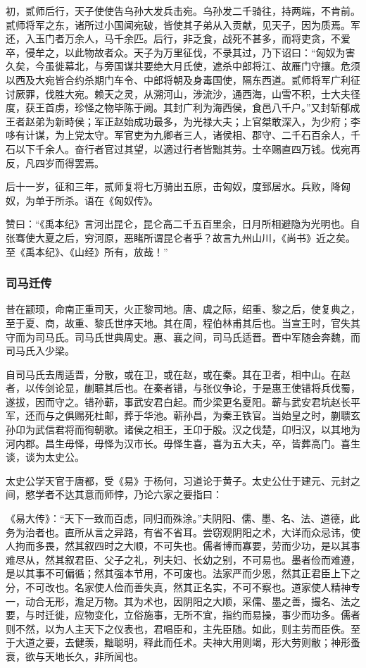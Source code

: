 \documentclass[]{article}
\begin{document}
初，贰师后行，天子使使告乌孙大发兵击宛。乌孙发二千骑往，持两端，不肯前。贰师将军之东，诸所过小国闻宛破，皆使其子弟从入贡献，见天子，因为质焉。军还，入玉门者万余人，马千余匹。后行，非乏食，战死不甚多，而将吏贪，不爱卒，侵牟之，以此物故者众。天子为万里征伐，不录其过，乃下诏曰：``匈奴为害久矣，今虽徙幕北，与旁国谋共要绝大月氏使，遮杀中郎将江、故雁门守攘。危须以西及大宛皆合约杀期门车令、中郎将朝及身毒国使，隔东西道。贰师将军广利征讨厥罪，伐胜大宛。赖天之灵，从溯河山，涉流沙，通西海，山雪不积，士大夫径度，获王首虏，珍怪之物毕陈于阙。其封广利为海西侯，食邑八千户。''又封斩郁成王者赵弟为新畤侯；军正赵始成功最多，为光禄大夫；上官桀敢深入，为少府；李哆有计谋，为上党太守。军官吏为九卿者三人，诸侯相、郡守、二千石百余人，千石以下千余人。奋行者官过其望，以適过行者皆黜其劳。士卒赐直四万钱。伐宛再反，凡四岁而得罢焉。

后十一岁，征和三年，贰师复将七万骑出五原，击匈奴，度郅居水。兵败，降匈奴，为单于所杀。语在《匈奴传》。

赞曰：``《禹本纪》言河出昆仑，昆仑高二千五百里余，日月所相避隐为光明也。自张骞使大夏之后，穷河原，恶睹所谓昆仑者乎？故言九州山川，《尚书》近之矣。至《禹本纪》、《山经》所有，放哉！''

\hypertarget{header-n4752}{%
\subsubsection{司马迁传}\label{header-n4752}}

昔在颛顼，命南正重司天，火正黎司地。唐、虞之际，绍重、黎之后，使复典之，至于夏、商，故重、黎氏世序天地。其在周，程伯林甫其后也。当宣王时，官失其守而为司马氏。司马氏世典周史。惠、襄之间，司马氏适晋。晋中军随会奔魏，而司马氏入少梁。

自司马氏去周适晋，分散，或在卫，或在赵，或在秦。其在卫者，相中山。在赵者，以传剑论显，蒯聩其后也。在秦者错，与张仪争论，于是惠王使错将兵伐蜀，遂拔，因而守之。错孙蕲，事武安君白起。而少梁更名夏阳。蕲与武安君坑赵长平军，还而与之俱赐死杜邮，葬于华池。蕲孙昌，为秦王铁官。当始皇之时，蒯聩玄孙卬为武信君将而徇朝歌。诸侯之相王，王卬于殷。汉之伐楚，卬归汉，以其地为河内郡。昌生毋怿，毋怿为汉市长。毋怿生喜，喜为五大夫，卒，皆葬高门。喜生谈，谈为太史公。

太史公学天官于唐都，受《易》于杨何，习道论于黄子。太史公仕于建元、元封之间，愍学者不达其意而师悖，乃论六家之要指曰：

《易大传》：``天下一致而百虑，同归而殊涂。''夫阴阳、儒、墨、名、法、道德，此务为治者也。直所从言之异路，有省不省耳。尝窃观阴阳之术，大详而众忌讳，使人拘而多畏，然其叙四时之大顺，不可失也。儒者博而寡要，劳而少功，是以其事难尽从，然其叙君臣、父子之礼，列夫妇、长幼之别，不可易也。墨者俭而难遵，是以其事不可偏循；然其强本节用，不可废也。法家严而少恩，然其正君臣上下之分，不可改也。名家使人俭而善失真，然其正名实，不可不察也。道家使人精神专一，动合无形，澹足万物。其为术也，因阴阳之大顺，采儒、墨之善，撮名、法之要，与时迁徙，应物变化，立俗施事，无所不宜，指约而易操，事少而功多。儒者则不然，以为人主天下之仪表也，君唱臣和，主先臣随。如此，则主劳而臣佚。至于大道之要，去健羡，黜聪明，释此而任术。夫神大用则竭，形大劳则敝；神形蚤衰，欲与天地长久，非所闻也。
\end{document}

